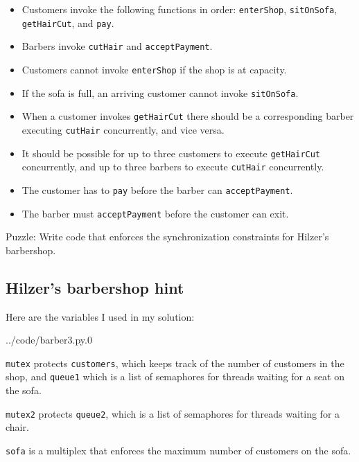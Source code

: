 \documentclass{book}
\begin{document}
\begin{itemize}

\item Customers invoke the following functions in order:
{\tt enterShop}, {\tt sitOnSofa},
{\tt getHairCut}, and {\tt pay}.

\item Barbers invoke {\tt cutHair} and {\tt acceptPayment}.

\item Customers cannot invoke {\tt enterShop} if the shop
is at capacity.

\item If the sofa is full, an arriving customer cannot invoke 
{\tt sitOnSofa}.

\item When a customer invokes {\tt getHairCut} there should be
a corresponding barber executing {\tt cutHair} concurrently,
and vice versa.

\item It should be possible for up to three customers to execute
{\tt getHairCut} concurrently, and up to three barbers to execute
{\tt cutHair} concurrently.

\item The customer has to {\tt pay} before the barber can
{\tt acceptPayment}.

\item The barber must {\tt acceptPayment} before the customer can
exit.

\end{itemize}

Puzzle: Write code that enforces the synchronization
constraints for Hilzer's barbershop.


\subsection {Hilzer's barbershop hint}

Here are the variables I used in my solution:


{../code/barber3.py.0}

{\tt mutex} protects {\tt customers}, which keeps track of the
number of customers in the shop, and {\tt queue1} which is a list
of semaphores for threads waiting for a seat on the sofa.

{\tt mutex2} protects {\tt queue2}, which is a list
of semaphores for threads waiting for a chair.

{\tt sofa} is a multiplex that enforces the maximum number of customers
on the sofa.
\end{document}

